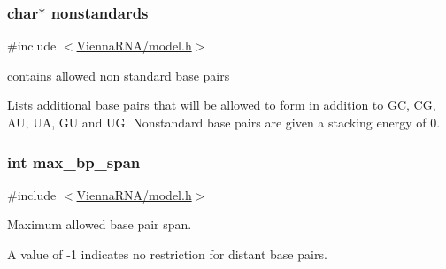 \subsubsection[{\texorpdfstring{nonstandards}{nonstandards}}]{\setlength{\rightskip}{0pt plus 5cm}char$\ast$ nonstandards}\hypertarget{group__model__details_ga2695d91cc535d09c2eae5c3884e2ec64}{}\label{group__model__details_ga2695d91cc535d09c2eae5c3884e2ec64}


{\ttfamily \#include $<$\hyperlink{model_8h}{Vienna\+R\+N\+A/model.\+h}$>$}



contains allowed non standard base pairs 

Lists additional base pairs that will be allowed to form in addition to GC, CG, AU, UA, GU and UG. Nonstandard base pairs are given a stacking energy of 0. 
\subsubsection[{\texorpdfstring{max\+\_\+bp\+\_\+span}{max_bp_span}}]{\setlength{\rightskip}{0pt plus 5cm}int max\+\_\+bp\+\_\+span}\hypertarget{group__model__details_ga18df869af0d70101106458fc3f027806}{}\label{group__model__details_ga18df869af0d70101106458fc3f027806}


{\ttfamily \#include $<$\hyperlink{model_8h}{Vienna\+R\+N\+A/model.\+h}$>$}



Maximum allowed base pair span. 

A value of -\/1 indicates no restriction for distant base pairs. 
